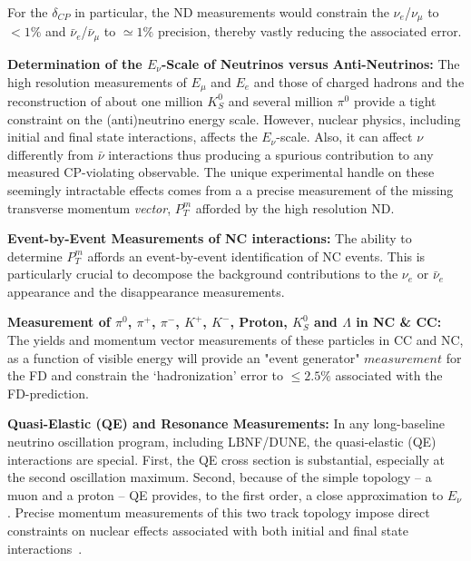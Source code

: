 For the $\delta_{CP}$ in particular, the ND measurements would constrain the $\nu_e$/$\nu_\mu$ to 
$<1\%$ and $\bar \nu_e$/$\bar \nu_\mu$ to $\simeq 1\%$ precision, thereby vastly reducing the associated error. 



\vspace{0.25cm} 
\noindent 
{\bf Determination of the $E_\nu$-Scale of Neutrinos versus Anti-Neutrinos:} The high resolution 
measurements of $E_\mu$ and $E_e$ and those of charged hadrons and the reconstruction of about one 
million $K^0_S$ and several million $\pi^0$ provide a tight constraint on the (anti)neutrino energy scale. 
However,  nuclear physics, including initial and final state interactions, 
 affects the $E_\nu$-scale. Also, it can affect $\nu$ differently from $\bar\nu$ interactions thus  
producing a spurious contribution to any measured CP-violating observable. 
The unique experimental handle on these seemingly intractable effects comes from a 
a precise measurement of the missing transverse momentum {\it vector},{ \bf{ $P^m_T$}} afforded by the 
high resolution ND. 


\vspace{0.25cm} 
\noindent 
{\bf Event-by-Event Measurements of NC interactions:} The ability to determine  { \bf{ $P^m_T$}} affords an event-by-event 
identification of NC events. This is particularly crucial to decompose the background contributions to 
the $\nu_e$ or $\bar \nu_e$ appearance and the disappearance measurements. 


\vspace{0.25cm} 
\noindent 
{\bf Measurement of $\pi^0$, $\pi^+$, $\pi^-$, $K^+$, $K^-$, Proton, $K^0_S$ and $\Lambda$ in NC \& CC:} 
The yields and momentum vector measurements of these particles in CC and NC, as a function of 
visible energy will provide an "event generator" $measurement$ for the FD and constrain the 
`hadronization' error to $\leq 2.5\%$ associated with the FD-prediction. 




\vspace{0.25cm} 
\noindent 
{\bf Quasi-Elastic (QE) and Resonance Measurements:}  
In any long-baseline neutrino oscillation program, including LBNF/DUNE, 
the quasi-elastic (QE) interactions are special. First, the QE cross section is substantial, especially at the second oscillation maximum. 
Second, because of the simple topology -- a muon and a proton -- QE provides, to the first order, 
a close approximation to $E_\nu$.  
Precise momentum measurements  of this two track topology impose direct constraints on nuclear effects 
associated with both initial and final state interactions~\cite{ND-QE}. 

